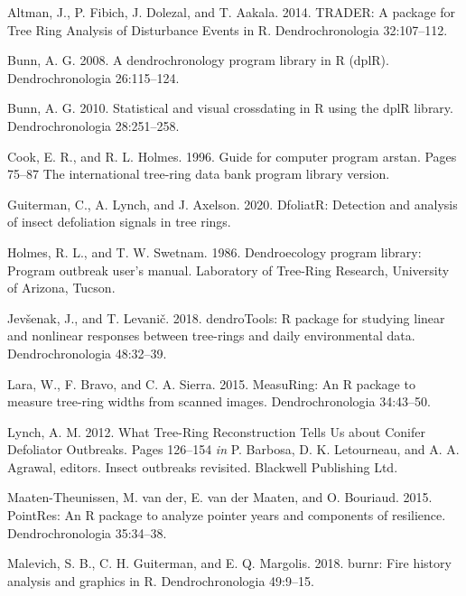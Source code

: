 \documentclass[review]{elsarticle} %
\begin{document}
\hypertarget{refs}{}
\leavevmode\hypertarget{ref-Altman2014}{}%
Altman, J., P. Fibich, J. Dolezal, and T. Aakala. 2014. TRADER: A
package for Tree Ring Analysis of Disturbance Events in R.
Dendrochronologia 32:107--112.

\leavevmode\hypertarget{ref-Bunn2008}{}%
Bunn, A. G. 2008. A dendrochronology program library in R (dplR).
Dendrochronologia 26:115--124.

\leavevmode\hypertarget{ref-Bunn2010}{}%
Bunn, A. G. 2010. Statistical and visual crossdating in R using the dplR
library. Dendrochronologia 28:251--258.

\leavevmode\hypertarget{ref-arstan}{}%
Cook, E. R., and R. L. Holmes. 1996. Guide for computer program arstan.
Pages 75--87 The international tree-ring data bank program library
version.

\leavevmode\hypertarget{ref-dfoliatR}{}%
Guiterman, C., A. Lynch, and J. Axelson. 2020. DfoliatR: Detection and
analysis of insect defoliation signals in tree rings.

\leavevmode\hypertarget{ref-outbreak}{}%
Holmes, R. L., and T. W. Swetnam. 1986. Dendroecology program library:
Program outbreak user's manual. Laboratory of Tree-Ring Research,
University of Arizona, Tucson.

\leavevmode\hypertarget{ref-Jevsenak2018}{}%
Jevšenak, J., and T. Levanič. 2018. dendroTools: R package for studying
linear and nonlinear responses between tree-rings and daily
environmental data. Dendrochronologia 48:32--39.

\leavevmode\hypertarget{ref-Lara2015}{}%
Lara, W., F. Bravo, and C. A. Sierra. 2015. MeasuRing: An R package to
measure tree-ring widths from scanned images. Dendrochronologia
34:43--50.

\leavevmode\hypertarget{ref-Lynch2012}{}%
Lynch, A. M. 2012. What Tree-Ring Reconstruction Tells Us about Conifer
Defoliator Outbreaks. Pages 126--154 \emph{in} P. Barbosa, D. K.
Letourneau, and A. A. Agrawal, editors. Insect outbreaks revisited.
Blackwell Publishing Ltd.

\leavevmode\hypertarget{ref-VanderMaaten-Theunissen2015}{}%
Maaten-Theunissen, M. van der, E. van der Maaten, and O. Bouriaud. 2015.
PointRes: An R package to analyze pointer years and components of
resilience. Dendrochronologia 35:34--38.

\leavevmode\hypertarget{ref-Malevich2018}{}%
Malevich, S. B., C. H. Guiterman, and E. Q. Margolis. 2018. burnr: Fire
history analysis and graphics in R. Dendrochronologia 49:9--15.
\end{document}
